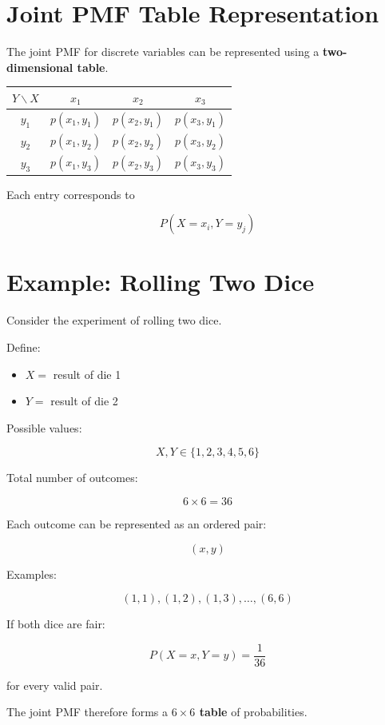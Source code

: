 \documentclass[12pt]{article}
\begin{document}
\section{Joint PMF Table Representation}

The joint PMF for discrete variables can be represented using a \textbf{two-dimensional table}.

\begin{center}
\begin{tabular}{c|ccc}
$Y \backslash X$ & $x_1$ & $x_2$ & $x_3$ \\
\hline
$y_1$ & $p(x_1,y_1)$ & $p(x_2,y_1)$ & $p(x_3,y_1)$ \\
$y_2$ & $p(x_1,y_2)$ & $p(x_2,y_2)$ & $p(x_3,y_2)$ \\
$y_3$ & $p(x_1,y_3)$ & $p(x_2,y_3)$ & $p(x_3,y_3)$
\end{tabular}
\end{center}

Each entry corresponds to

\[
P(X=x_i, Y=y_j)
\]

\section{Example: Rolling Two Dice}

Consider the experiment of rolling two dice.

Define:

\begin{itemize}
\item $X =$ result of die 1
\item $Y =$ result of die 2
\end{itemize}

Possible values:

\[
X,Y \in \{1,2,3,4,5,6\}
\]

Total number of outcomes:

\[
6 \times 6 = 36
\]

Each outcome can be represented as an ordered pair:

\[
(x,y)
\]

Examples:

\[
(1,1), (1,2), (1,3), \ldots, (6,6)
\]

If both dice are fair:

\[
P(X=x, Y=y) = \frac{1}{36}
\]

for every valid pair.

The joint PMF therefore forms a \textbf{$6 \times 6$ table} of probabilities.
\end{document}
